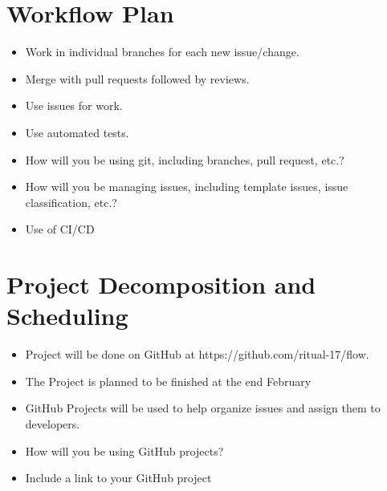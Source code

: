 \documentclass{article}
\begin{document}

\section{Workflow Plan}

\begin{itemize}

	\item Work in individual branches for each new issue/change. 
	\item Merge with pull requests followed by reviews.
	\item Use issues for work.
	\item Use automated tests. 
	\item How will you be using git, including branches, pull request, etc.?
	\item How will you be managing issues, including template issues, issue
	classification, etc.?
  \item Use of CI/CD
\end{itemize}

\section{Project Decomposition and Scheduling}

\begin{itemize}
  \item Project will be done on GitHub at https://github.com/ritual-17/flow.
  \item The Project is planned to be finished at the end February 
  \item GitHub Projects will be used to help organize issues and assign them to developers. 
  \item How will you be using GitHub projects?
  
  \item Include a link to your GitHub project
  
\end{itemize}

\end{document}
